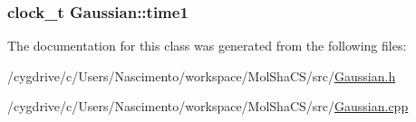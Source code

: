 \label{classGaussian_a32d5fa91e8452f5d333b8cd7f4e588f6}
\hypertarget{classGaussian_aac68a2973eaa8d40f218fe64e025093b}{
\subsubsection[{time1}]{\setlength{\rightskip}{0pt plus 5cm}clock\_\-t {\bf Gaussian::time1}}}
\label{classGaussian_aac68a2973eaa8d40f218fe64e025093b}


The documentation for this class was generated from the following files:\begin{DoxyCompactItemize}
\item 
/cygdrive/c/Users/Nascimento/workspace/MolShaCS/src/\hyperlink{Gaussian_8h}{Gaussian.h}\item 
/cygdrive/c/Users/Nascimento/workspace/MolShaCS/src/\hyperlink{Gaussian_8cpp}{Gaussian.cpp}\end{DoxyCompactItemize}
